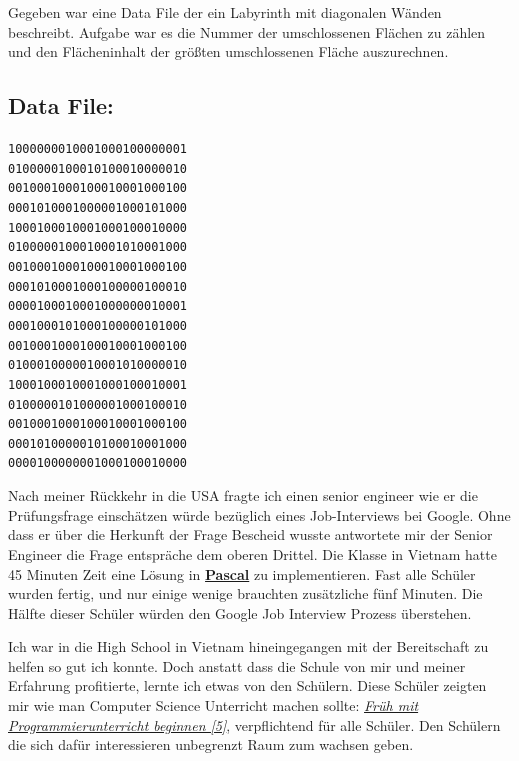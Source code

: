 \documentclass[10pt,a4paper,ngerman,twoside]{article} %
\begin{document}
\begin{multicols}{3}
Gegeben war eine Data File der ein Labyrinth mit diagonalen Wänden beschreibt. Aufgabe war es die Nummer der umschlossenen Flächen zu zählen und den Flächeninhalt der größten umschlossenen Fläche auszurechnen.

\subsection*{Data File:}
\large
\texttt{1000000010001000100000001 \\
0100000100010100010000010 \\
0010001000100010001000100 \\
0001010001000001000101000 \\
1000100010001000100010000 \\
0100000100010001010001000 \\
0010001000100010001000100 \\
0001010001000100000100010 \\
0000100010001000000010001 \\
0001000101000100000101000 \\
0010001000100010001000100 \\
0100010000010001010000010 \\
1000100010001000100010001 \\
0100000101000001000100010 \\
0010001000100010001000100 \\
0001010000010100010001000 \\
0000100000001000100010000 \\
}
\normalsize 


Nach meiner Rückkehr in die USA fragte ich einen senior engineer wie er die Prüfungsfrage einschätzen würde bezüglich eines Job-Interviews bei Google. Ohne dass er über die Herkunft der Frage Bescheid wusste antwortete mir der Senior Engineer die Frage entspräche dem oberen Drittel. Die Klasse in Vietnam hatte 45 Minuten Zeit eine Lösung in \href{http://de.wikipedia.org/wiki/Pascal_(Programmiersprache)}{\textbf{Pascal}} zu implementieren. Fast alle Schüler wurden fertig, und nur einige wenige brauchten zusätzliche fünf Minuten. Die Hälfte dieser Schüler würden den Google Job Interview Prozess überstehen.

Ich war in die High School in Vietnam hineingegangen mit der Bereitschaft zu helfen so gut ich konnte. Doch anstatt dass die Schule von mir und meiner Erfahrung profitierte, lernte ich etwas von den Schülern. Diese Schüler zeigten mir wie man Computer Science Unterricht machen sollte: \href{http://neil.fraser.name/news/2012/07/01/}{\textit{Fr\"uh mit Programmierunterricht beginnen [5]}}, verpflichtend für alle Schüler. Den Schülern die sich dafür interessieren unbegrenzt Raum zum wachsen geben.


\end{multicols}
\end{document}
